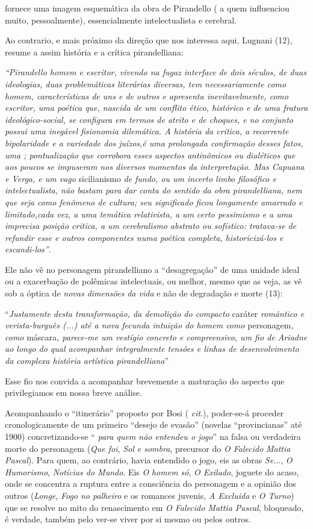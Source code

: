 fornece uma imagem esquemática da obra de Pirandello ( a quem
influenciou muito, pessoalmente), essencialmente intelectualista e
cerebral.

Ao contrario, e mais próximo da direção que nos interessa aqui, Lugnani
(12), resume a assim história e a crítica pirandelliana:

\emph{``Pirandello homem e escritor, vivendo na fugaz interface de dois
séculos, de duas ideologias, duas problemáticas literárias diversas, tem
necessariamente como homem, características de uns e de outros e
apresenta inevitavelmente, como escritor, uma poética que, nascida de um
conflito ético, histórico e de uma fratura ideológico-social, se
configura em termos de atrito e de choques, e no conjunto possui uma
inegável fisionomia dilemática. A história da critica, a recorrente
bipolaridade e a variedade dos juízos,é uma prolongada confirmação
desses fatos, uma ; pontualização que corrobora esses aspectos
antinômicos ou dialéticos que aos poucos se impuseram nos diversos
momentos da interpretação. Mas Capuana e Verga, e um vago} sicilianismo
\emph{de fundo, ou um incerto limbo filosófico e intelectualista, não
bastam para dar conta do sentido da obra pirandelliana, nem que seja
como fenômeno de cultura; seu significado ficou longamente amarrado e
limitado,cada vez, a uma temática relativista, a um certo pessimismo e a
uma imprecisa posição critica, a um cerebralismo abstrato ou sofístico:
tratava-se de refundir esse e outros componentes numa poética completa,
historicizá-los e escandi-los''}.

Ele não vê no personagem pirandelliano a ``desagregação'' de uma unidade
ideal ou a exacerbação de polêmicas intelectuais, ou melhor, mesmo que
as veja, as vê sob a óptica de \emph{novas dimensões da vida} e não de
degradação e morte (13):

``\emph{Justamente desta transformação, da demolição do compacto}
caráter \emph{romântico e verista-burguês (...) até a nova fecunda
intuição do homem como} personagem\emph{, como} máscara\emph{, parece-me
um vestígio concreto e compreensivo, um fio de Ariadne ao longo do qual
acompanhar integralmente tensões e linhas de desenvolvimento da complexa
história artística pirandelliana}''

Esse fio nos convida a acompanhar brevemente a maturação do aspecto que
privilegiamos em nossa breve análise.

Acompanhando o ``itinerário'' proposto por Bosi ( \emph{cit}.),
poder-se-á proceder cronologicamente de um primeiro ``desejo de evasão''
(novelas ``provincianas'' até 1900) concretizando-se `` \emph{para quem
não entendeu o jogo}'' na falsa ou verdadeira morte do personagem
(\emph{Que foi}, \emph{Sol e sombra}, precursor do \emph{O Falecido}
\emph{Mattia Pascal}). Para quem, ao contrário, havia entendido o jogo,
eis as obras \emph{Se.}.., \emph{O Humorismo}, \emph{Notícias do Mundo}.
Eis \emph{O} \emph{homem só}, \emph{O Exilado}, joguete do acaso, onde
se concentra a ruptura entre a consciência do personagem e a opinião dos
outros (\emph{Longe}, \emph{Fogo no palheiro} e os romances juvenis,
\emph{A Excluida} e \emph{O Turno}) que se resolve no mito do
renascimento em \emph{O Falecido Mattia Pascal}, bloqueado, é verdade,
também pelo ver-se viver por si mesmo ou pelos outros.

